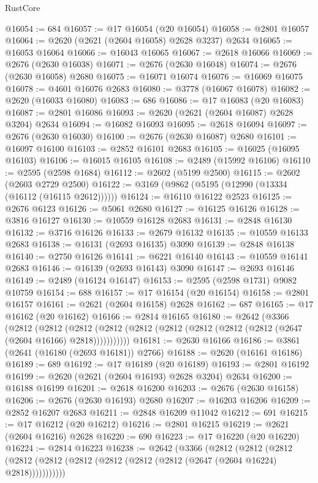 \begin{lexlean}{RustCore}
\begin{coremodule}
@16054 := 684
@16057 := @17 @16054 (@20 @16054)
@16058 := @2801 @16057
@16064 := @2620 (@2621 (@2604 @16058) @2628 @3237) @2634
@16065 := @16053 @16064
@16066 := @16043 @16065
@16067 := @2618 @16066
@16069 := @2676 (@2630 @16038)
@16071 := @2676 (@2630 @16048)
@16074 := @2676 (@2630 @16058) @2680
@16075 := @16071 @16074
@16076 := @16069 @16075
@16078 := @4601 @16076 @2683
@16080 := @3778 (@16067 @16078)
@16082 := @2620 (@16033 @16080)
@16083 := 686
@16086 := @17 @16083 (@20 @16083)
@16087 := @2801 @16086
@16093 := @2620 (@2621 (@2604 @16087) @2628 @3204) @2634
@16094 := @16082 @16093
@16095 := @2618 @16094
@16097 := @2676 (@2630 @16030)
@16100 := @2676 (@2630 @16087) @2680
@16101 := @16097 @16100
@16103 := @2852 @16101 @2683
@16105 := @16025 (@16095 @16103)
@16106 := @16015 @16105
@16108 := @2489 (@15992 @16106)
@16110 := @2595 (@2598 @1684)
@16112 := @2602 (@5199 @2500)
@16115 := @2602 (@2603 @2729 @2500)
@16122 := @3169 (@9862 (@5195 (@12990 (@13334 (@16112 (@16115 @2612))))))
@16124 := @16110 @16122 @2523
@16125 := @2676 @6123
@16126 := @5061 @2680
@16127 := @16125 @16126
@16128 := @3816 @16127
@16130 := @10559 @16128 @2683
@16131 := @2848 @16130
@16132 := @3716 @16126
@16133 := @2679 @16132
@16135 := @10559 @16133 @2683
@16138 := @16131 (@2693 @16135) @3090
@16139 := @2848 @16138
@16140 := @2750 @16126
@16141 := @6221 @16140
@16143 := @10559 @16141 @2683
@16146 := @16139 (@2693 @16143) @3090
@16147 := @2693 @16146
@16149 := @2489 (@16124 @16147)
@16153 := @2595 (@2598 @1731) @9082 @10759
@16154 := 688
@16157 := @17 @16154 (@20 @16154)
@16158 := @2801 @16157
@16161 := @2621 (@2604 @16158) @2628
@16162 := 687
@16165 := @17 @16162 (@20 @16162)
@16166 := @2814 @16165
@16180 := @2642
    (@3366
      (@2812
        (@2812
          (@2812 (@2812 (@2812 (@2812 (@2812 (@2812 (@2812 (@2647 (@2604 @16166) @2818)))))))))))
@16181 := @2630 @16166
@16186 := @3861 (@2641 (@16180 (@2693 @16181)) @2766)
@16188 := @2620 (@16161 @16186)
@16189 := 689
@16192 := @17 @16189 (@20 @16189)
@16193 := @2801 @16192
@16199 := @2620 (@2621 (@2604 @16193) @2628 @3204) @2634
@16200 := @16188 @16199
@16201 := @2618 @16200
@16203 := @2676 (@2630 @16158)
@16206 := @2676 (@2630 @16193) @2680
@16207 := @16203 @16206
@16209 := @2852 @16207 @2683
@16211 := @2848 @16209 @11042
@16212 := 691
@16215 := @17 @16212 (@20 @16212)
@16216 := @2801 @16215
@16219 := @2621 (@2604 @16216) @2628
@16220 := 690
@16223 := @17 @16220 (@20 @16220)
@16224 := @2814 @16223
@16238 := @2642
    (@3366
      (@2812
        (@2812
          (@2812 (@2812 (@2812 (@2812 (@2812 (@2812 (@2812 (@2647 (@2604 @16224) @2818)))))))))))

\end{coremodule}
\end{lexlean}
